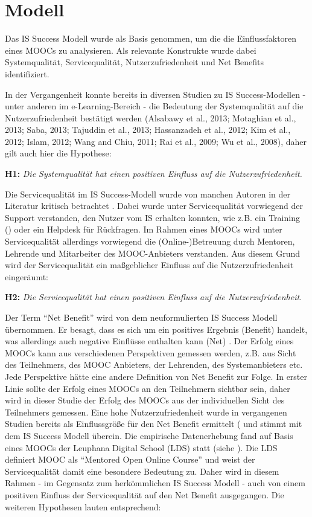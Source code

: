 \section{Modell}
\label{sec:modell}
Das IS Success Modell wurde als Basis genommen, um die die Einflussfaktoren eines MOOCs zu analysieren. Als relevante Konstrukte wurde dabei Systemqualität, Servicequalität, Nutzerzufriedenheit und Net Benefits identifiziert.  

In der Vergangenheit konnte bereits in diversen Studien zu IS Success-Modellen - unter anderen im e-Learning-Bereich - die Bedeutung der Systemqualität auf die Nutzerzufriedenheit bestätigt werden (Alsabawy et al., 2013; Motaghian et al., 2013; Saba, 2013; Tajuddin et al., 2013; Hassanzadeh et al., 2012; Kim et al., 2012; Islam, 2012; Wang and Chiu, 2011; Rai et al., 2009; Wu et al., 2008), daher gilt auch hier die Hypothese: \medskip

\textbf{H1:} \textit{Die Systemqualität hat einen positiven Einfluss auf die Nutzerzufriedenheit.} \medskip

Die Servicequalität im IS Success-Modell wurde von manchen Autoren in der Literatur kritisch betrachtet . Dabei wurde unter Servicequalität vorwiegend der Support verstanden, den Nutzer vom IS erhalten konnten, wie z.B. ein Training (\parencite{petter2009meta}) oder ein Helpdesk für Rückfragen. Im Rahmen eines MOOCs wird unter Servicequalität allerdings vorwiegend die (Online-)Betreuung durch Mentoren, Lehrende und Mitarbeiter des MOOC-Anbieters verstanden. Aus diesem Grund wird der Servicequalität ein maßgeblicher Einfluss auf die Nutzerzufriedenheit eingeräumt: \medskip

\textbf{H2:} \textit{Die Servicequalität hat einen positiven Einfluss auf die Nutzerzufriedenheit.}\medskip

Der Term "`Net Benefit"' wird von dem neuformulierten IS Success Modell übernommen. Er besagt, dass es sich um ein positives Ergebnis (Benefit) handelt, was allerdings auch negative Einflüsse enthalten kann (Net) \parencite[vgl.][S.2974]{delone2002information}. Der Erfolg eines MOOCs kann aus verschiedenen Perspektiven gemessen werden, z.B. aus Sicht des Teilnehmers, des MOOC Anbieters, der Lehrenden, des Systemanbieters etc. Jede Perspektive hätte eine andere Definition von Net Benefit zur Folge. In erster Linie sollte der Erfolg eines MOOCs an den Teilnehmern sichtbar sein, daher wird in dieser Studie der Erfolg des MOOCs aus der individuellen Sicht des Teilnehmers gemessen. Eine hohe Nutzerzufriedenheit wurde in vergangenen Studien bereits als Einflussgröße für den Net Benefit ermittelt ( und stimmt mit dem IS Success Modell überein. Die empirische Datenerhebung fand auf Basis eines MOOCs der Leuphana Digital School (LDS) statt (siehe ). Die LDS definiert MOOC als "`Mentored Open Online Course"' und weist der Servicequalität damit eine besondere Bedeutung zu. Daher wird in diesem Rahmen - im Gegensatz zum herkömmlichen IS Success Modell - auch von einem positiven Einfluss der Servicequalität auf den Net Benefit ausgegangen. Die weiteren Hypothesen lauten entsprechend: \medskip


